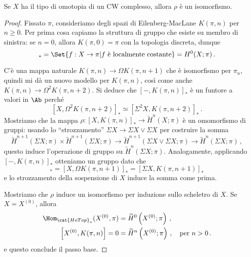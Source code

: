 	\begin{thm}\label{coh-rep}
		Se $X$ ha il tipo di omotopia di un CW complesso,
		allora $\rho$ è un isomorfismo.
		\begin{proof}
			Fissato $\pi$, consideriamo degli spazi di Eilenberg-MacLane
			$K(\pi,n)$ per $n \ge 0$. Per prima cosa capiamo
			la struttura di gruppo che esiste su membro di sinistra: %
			se $n=0$, allora $K(\pi,0)=\pi$ con la topologia discreta, dunque
			\begin{equation*}
				[X,K(\pi,0)]_{\ast} = \Set{f:X \to \pi | f \text{ è localmente costante} }
				= H^{0}(X;\pi)\,.
			\end{equation*}
			
			C'è una mappa naturale $K(\pi,n) \to \Omega K(\pi,n+1)$
			che è isomorfismo per $\pi_{n}$, quindi mi dà un nuovo modello per $K(\pi,n)$,
			così come anche $K(\pi,n) \to\Omega^{2} K(\pi, n+2)$.
			Si deduce che $[-,K(\pi,n)]_{\ast}$ è un funtore a valori in $\Ab$
			perché
			\begin{equation*}
				\left[X,\Omega^{2}K(\pi,n+2)\right]_{\ast} \simeq 
				\left[\Sigma^{2} X, K(\pi,n+2)\right]_{\ast}\,.
			\end{equation*}
			Mostriamo che la mappa $\rho: [X,K(\pi,n)]_{\ast} \to \widetilde{H}^{n}(X;\pi)$ 
			è un omomorfismo di gruppi: 
			usando lo ``strozzamento'' $\Sigma X \to \Sigma X \vee \Sigma X$
			per costruire la somma
		\begin{equation*}
			\widetilde{H}^{n+1}(\Sigma X;\pi) \times \widetilde{H}^{n+1}(\Sigma X;\pi)
			\longrightarrow \widetilde{H}^{n+1}(\Sigma X \vee \Sigma X;\pi)
			\longrightarrow \widetilde{H}^{n}(\Sigma X;\pi)\,,
		\end{equation*}
		questo induce l'operazione di gruppo su $\widetilde{H}^{n}(\Sigma X;\pi)$.
		Analogamente, applicando $[-,K(\pi,n)]_{\ast}$ otteniamo un gruppo dato che
		\begin{equation*}
			[X,K(\pi,n)]_{\ast} = [X,\Omega K(\pi,n+1)]_{\ast} = [\Sigma X,K(\pi,n+1)]_{\ast}
		\end{equation*}
		e lo strozzamento della sospensione di $X$ induce la somma come prima.
		
		Mostriamo che $\rho$ induce un isomorfismo per induzione sullo scheletro di $X$.
		Se $X=X^{(0)}$, allora
		\begin{align*}
			\Hom_{\cat{HoTop}_{\ast}}(X^{(0)},\pi) &= \widetilde{H}^{0}\left(X^{(0)};\pi\right)\,, \\
			\left[ X^{(0)}, K(\pi,n) \right] = 0 
			&= \widetilde{H}^{n}\left(X^{(0)};\pi\right)\,, \quad \text{per } n>0\,.
		\end{align*}
		e questo conclude il passo base. 
		

\end{proof}
\end{thm}
